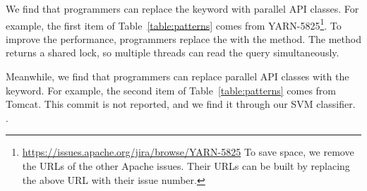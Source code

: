 
We find that programmers can replace the  keyword with parallel API classes. For example, the first item of Table~\ref{table:patterns} comes from YARN-5825\footnote{\url{https://issues.apache.org/jira/browse/YARN-5825} To save space, we remove the URLs of the other Apache issues. Their URLs can be built by replacing the above URL with their issue number.}. To improve the performance, programmers replace the  with the  method. The method returns a shared lock, so multiple threads can read the query simultaneously.



Meanwhile, we find that programmers can replace parallel API classes with the  keyword. For example, the second item of Table~\ref{table:patterns} comes from Tomcat. This commit is not reported, and we find it through our SVM classifier. . 


